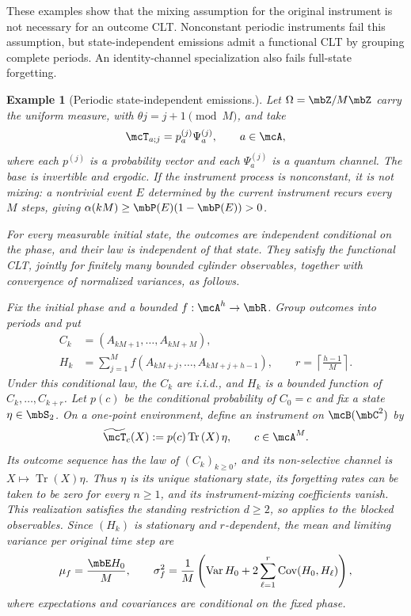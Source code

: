 \documentclass[a4paper]{article}
\numberwithin{equation}{section}   %
\theoremstyle{plain}   %
\theoremstyle{plain}   %
\theoremstyle{examplestyle}
\newtheorem{example}{Example}
\DeclareMathOperator{\pr}{\mbP}           %
\renewcommand{\tr}[1]{\operatorname{Tr}\left(#1\right)} %
\begin{document}
\begin{appendix}

    These examples show that the mixing assumption for the original instrument is not necessary for an outcome CLT. Nonconstant periodic instruments fail this assumption, but state-independent emissions admit a functional CLT by grouping complete periods.
    An identity-channel specialization also fails full-state forgetting.

\begin{example}[Periodic state-independent emissions.]
\label{eg:periodic-state-independent-emissions}
    Let $\Omega=\mbZ/M\mbZ$ carry the uniform measure, with $\theta j=j+1\pmod M$, and take
    \[
     \mcT_{a;j}=p_a^{(j)}\Psi_a^{(j)},
     \qquad a\in\mcA,
    \]
    where each $p^{(j)}$ is a probability vector and each $\Psi_a^{(j)}$ is a quantum channel.
    The base is invertible and ergodic. 
    If the instrument process is nonconstant, it is not mixing: a nontrivial event $E$ determined by the current instrument recurs every $M$ steps, giving $\alpha(kM)\ge\pr(E)(1-\pr(E))>0$.

    For every measurable initial state, the outcomes are independent conditional on the phase, and their law is independent of that state.
    They satisfy the functional CLT, jointly for finitely many bounded cylinder observables, together with convergence of normalized variances, as follows.

    Fix the initial phase and a bounded $f:\mcA^h\to\mbR$.
        Group outcomes into periods and put
    \[
     \begin{aligned}
     C_k&=(A_{kM+1},\ldots,A_{kM+M}),\\
     H_k&=\sum_{j=1}^M
           f(A_{kM+j},\ldots,A_{kM+j+h-1}),
     \qquad
     r=\left\lceil\frac{h-1}{M}\right\rceil.
     \end{aligned}
    \]
    Under this conditional law, the $C_k$ are i.i.d., and $H_k$ is a bounded function of $C_k,\ldots,C_{k+r}$.
    Let $p(c)$ be the conditional probability of $C_0=c$ and fix a state $\eta\in\mbS_2$.
    On a one-point environment, define an instrument on $\mcB(\mbC^2)$ by
    \[
        \widetilde{\mcT}_c(X):=p(c)\tr{X}\eta,
        \qquad c\in\mcA^M.
    \]
    Its outcome sequence has the law of $(C_k)_{k\ge0}$, and its non-selective channel is $X\mapsto\tr{X}\eta$.
    Thus $\eta$ is its unique stationary state, its forgetting rates can be taken to be zero for every $n\ge1$, and its instrument-mixing coefficients vanish.
    This realization satisfies the standing restriction $d\ge2$, so  applies to the blocked observables.
    Since $(H_k)$ is stationary and $r$-dependent, the mean and limiting variance per original time step are
    \[
         \mu_f=\frac{\mbE H_0}{M},
         \qquad
         \sigma_f^2=\frac1M\left(
               \operatorname{Var}H_0
               +2\sum_{\ell=1}^r\operatorname{Cov}(H_0,H_\ell)
                                 \right),
    \]
    where expectations and covariances are conditional on the fixed phase.
    

\end{example}
\end{appendix}
\end{document}
